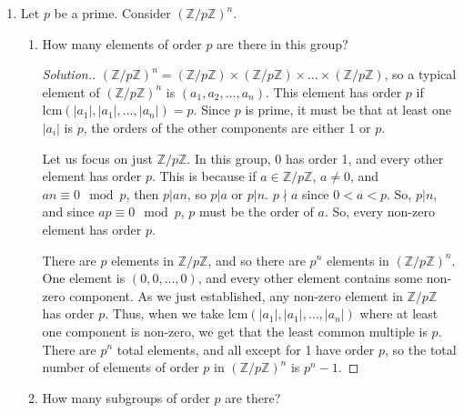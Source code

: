 \documentclass{article}
\newcommand{\sk}{\smallskip}
\newcommand{\Z}{\mathbb{Z}}
\begin{document}
\begin{enumerate}
\begin{enumerate}
\begin{proof}[Solution.]
            \sk

            Since $\phi$ is well-defined, injective, surjective, and operation preserving, $\phi$ is an isomorphism between $(G_1/H_1) \times (G_1/H_2)$ and $(G_1 \times G_2)/(H_1 \times H_2)$, and so the two groups are isomorphic.
            
        \end{proof}
    \end{enumerate}


    \item Let $p$ be a prime. Consider $(\Z/p\Z)^n$.
    \begin{enumerate}
        \item How many elements of order $p$ are there in this group?
        \begin{proof}[Solution.]
            $(\Z/p\Z)^n = (\Z/p\Z) \times (\Z/p\Z) \times \dots \times (\Z/p\Z)$, so a typical element of $(\Z/p\Z)^n$ is $(a_1, a_2, \dots, a_n)$. This element has order $p$ if $\text{lcm}(|a_1|, |a_1|, \dots, |a_n|) = p$. Since $p$ is prime, it must be that at least one $|a_i|$ is $p$, the orders of the other components are either 1 or $p$. 

            \sk

            Let us focus on just $\Z/p\Z$. In this group, 0 has order 1, and every other element has order $p$. This is because if $a \in \Z/p\Z$, $a \neq 0$, and $an \equiv 0 \mod p$, then $p | an$, so $p | a$ or $p | n$. $p \nmid a$ since $0 < a < p$. So, $p | n$, and since $ap \equiv 0 \mod p$, $p$ must be the order of $a$. So, every non-zero element has order $p$. 

            \sk

            There are $p$ elements in $\Z/p\Z$, and so there are $p^n$ elements in $(\Z/p\Z)^n$. One element is $(0, 0, \dots, 0)$, and every other element contains some non-zero component. As we just established, any non-zero element in $\Z/p\Z$ has order $p$. Thus, when we take $\text{lcm}(|a_1|, |a_1|, \dots, |a_n|)$ where at least one component is non-zero, we get that the least common multiple is $p$. There are $p^n$ total elements, and all except for 1 have order $p$, so the total number of elements of order $p$ in $(\Z/p\Z)^n$ is $p^n - 1$.
        \end{proof}
  
        \item How many subgroups of order $p$ are there?


\end{enumerate}
\end{enumerate}
\end{document}
